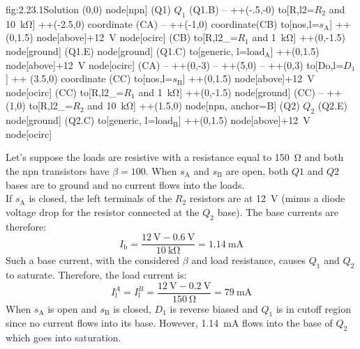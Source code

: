 \begin{circuit}{fig:2.23.1}{Solution}
    (0,0) node[npn] (Q1) {$Q_1$}
    (Q1.B) -- ++(-.5,-0)
    to[R,l2=$R_2$ and \SI{10}{\kilo\ohm}] ++(-2.5,0) coordinate (CA)
    -- ++(-1,0) coordinate(CB)
    to[nos,l=$s_\text{A}$] ++(0,1.5)
    node[above]{+\SI{12}{\volt}} node[ocirc] {}
    (CB) to[R,l2_=$R_1$ and \SI{1}{\kilo\ohm}] ++(0,-1.5)
    node[ground] {}
    (Q1.E) node[ground] {}
    (Q1.C) to[generic, l=$\text{load}_\text{A}$] ++(0,1.5)
    node[above]{+\SI{12}{\volt}} node[ocirc] {}
    (CA) -- ++(0,-3) -- ++(5,0) -- ++(0,3)
    to[Do,l=$D_1$] ++ (3.5,0) coordinate (CC)
    to[nos,l=$s_\text{B}$] ++(0,1.5)
    node[above]{+\SI{12}{\volt}} node[ocirc] {}
    (CC) to[R,l2_=$R_1$ and \SI{1}{\kilo\ohm}] ++(0,-1.5)
    node[ground] {}
    (CC) -- ++(1,0) 
    to[R,l2_=$R_2$ and \SI{10}{\kilo\ohm}] ++(1.5,0)
    node[npn, anchor=B] (Q2) {$Q_2$}
    (Q2.E) node[ground] {}
    (Q2.C) to[generic, l=$\text{load}_\text{B}$] ++(0,1.5)
    node[above]{+\SI{12}{\volt}} node[ocirc] {}
\end{circuit}
Let's suppose the loads are resistive with a resistance equal to \SI{150}{\ohm} and both the npn transistors have $\beta=100$.
When $s_\text{A}$ and $s_\text{B}$ are open, both $Q1$ and $Q2$ bases are to ground and no current flows into the loads.\\
If $s_\text{A}$ is closed, the left terminals of the $R_2$ resistors are at \SI{12}{\volt} (minus a diode voltage drop for the resistor connected at the $Q_2$ base). The base currents are therefore:
\[I_\text{b}=\frac{\SI{12}{\volt}-\SI{0.6}{\volt}}{\SI{10}{\kilo\ohm}}=\SI{1.14}{\milli\ampere}\]
Such a base current, with the considered $\beta$ and load resistance, causes $Q_1$ and $Q_2$ to saturate. Therefore, the load current is:
\[I_\text{l}^{A} = I_\text{l}^{B} = \frac{\SI{12}{\volt}-\SI{0.2}{\volt}}{\SI{150}{\ohm}}=\SI{79}{\milli\ampere}\]
When $s_\text{A}$ is open and $s_\text{B}$ is closed, $D_1$ is reverse biased and $Q_1$ is in cutoff region since no current flows into its base. However, \SI{1.14}{\milli\ampere} flows into the base of $Q_2$ which goes into saturation.

